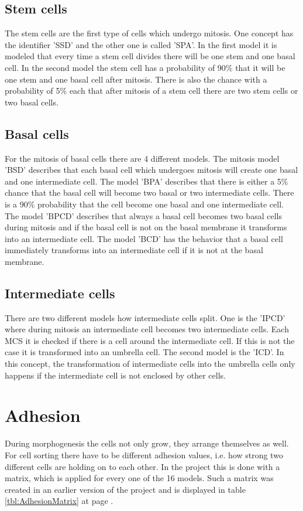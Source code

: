 \subsection{Stem cells}
The stem cells are the first type of cells which undergo mitosis. One concept has the identifier 'SSD' and the other one is called 'SPA'. In the first model it is modeled that every time a stem cell divides there will be one stem and one basal cell. In the second model the stem cell has a probability of 90\% that it will be one stem and one basal cell after mitosis. There is also the chance with a probability of 5\% each that after mitosis of a stem cell there are two stem cells or two basal cells.
\subsection{Basal cells}
For the mitosis of basal cells there are 4 different models. The mitosis model 'BSD' describes that each basal cell which undergoes mitosis will create one basal and one intermediate cell. The model 'BPA' describes that there is either a 5\% chance that the basal cell will become two basal or two intermediate cells. There is a 90\% probability that the cell become one basal and one intermediate cell. The model 'BPCD' describes that always a basal cell becomes two basal cells during mitosis and if the basal cell is not on the basal membrane it transforms into an intermediate cell. The model 'BCD' has the behavior that a basal cell immediately transforms into an intermediate cell if it is not at the basal membrane.\newline
\subsection{Intermediate cells}
There are two different models how intermediate cells split. One is the 'IPCD' where during mitosis an intermediate cell becomes two intermediate cells. Each \ac{MCS} it is checked if there is a cell around the intermediate cell. If this is not the case it is transformed into an umbrella cell. The second model is the 'ICD'. In this concept, the transformation of intermediate cells into the umbrella cells only happens if the intermediate cell is not enclosed by other cells. \newline


\section{Adhesion}\label{sec:Adhesion}
During morphogenesis the cells not only grow, they arrange themselves as well. For cell sorting there have to be different adhesion values, i.e. how strong two different cells are holding on to each other. In the project this is done with a matrix, which is applied for every one of the 16 models. Such a matrix was created in an earlier version of the project \cite{Torelli2017} and is displayed in table \ref{tbl:AdhesionMatrix} at page \pageref{tbl:AdhesionMatrix}.


